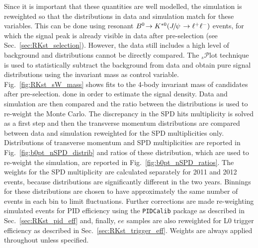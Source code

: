 Since it is important that these quantities are well modelled, the simulation is
reweighted so that the distributions in data and simulation match for these variables.
This can be done using resonant $\decay{\Bz}{\Kstarz(\jpsi\to\ll)}$ events, for which the signal peak
is already visible in data after pre-selection (see Sec.~\ref{sec:RKst_selection}). However, the data still includes
a high level of background and distributions cannot be directly compared.
The $_s\mathcal{P}$lot technique~\cite{sPlot} is used to statistically subtract the background from
data and obtain pure signal distributions using the invariant mass as control variable.
Fig.~\ref{fig:RKst_sW_mass} shows fits to the 4-body invariant mass of candidates after pre-selection.
done in order to estimate the signal density. Data and simulation are then compared 
and the ratio between the distributions is used to re-weight the Monte Carlo. The discrepancy 
in the SPD hits multiplicity is solved as a first step and then the \Bz transverse momentum 
distributions are compared between data and simulation reweighted for the SPD multiplicities only.
Distributions of \Bz transverse momentum and SPD multiplicities are reported in Fig.~\ref{fig:b0pt_nSPD_distrib}
and ratios of these distribution, which are used to re-weight the simulation, are reported in 
Fig.~\ref{fig:b0pt_nSPD_ratios}. The weights for the SPD multiplicity are calculated
separately for 2011 and 2012 events, because distributions are significantly different
in the two years. Binnings for these distributions are chosen to have approximately 
the same number of events in each bin to limit fluctuations.
Further corrections are made re-weighting simulated events for PID efficiency using the
\verb!PIDCalib! package as described in Sec.~\ref{sec:RKst_pid_eff} and, finally, 
$ee$ samples are also reweighted for L0 trigger efficiency as described in Sec.~\ref{sec:RKst_trigger_eff}.
Weights are always applied throughout unless specified.

